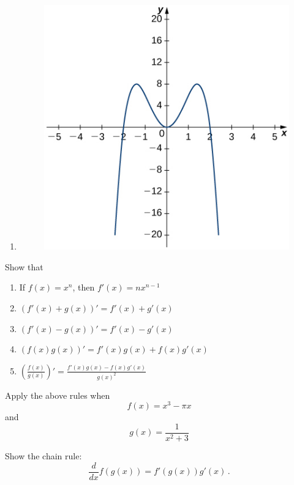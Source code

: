 \documentclass[12pt]{amsart}
\begin{document}
\begin{question}
\begin{enumerate}
		\item
		      \begin{figure}[!ht]
			      \includegraphics{figures/3.jpeg}
		      \end{figure}
	\end{enumerate}
\end{question}


\begin{question}
	Show that
	\begin{enumerate}
		\item If $\displaystyle f(x) = x^n$, then $f'(x) = n x^{n-1}$
		      \vspace{5cm}
		\item $ (f'(x) + g(x))' = f'(x) + g'(x)$
		      \vspace{5cm}
		\item $ (f'(x) - g(x))' = f'(x) - g'(x)$
		      \vspace{5cm}
		\item  $\displaystyle (f(x)g(x))'  = f'(x) g(x) + f(x) g'(x)$
		      \vspace{5cm}
		\item  $\displaystyle \left(\frac{f(x)}{g(x)}\right)'  = \frac{ f'(x) g(x) - f(x) g'(x)}{g(x)^2}$
		      \vspace{5cm}
	\end{enumerate}
\end{question}

\begin{question}
	Apply the above rules when
	$$f(x) = x^3 -\pi x$$
	and
	$$ g(x) = \frac{1}{x^2 + 3} $$
\end{question}
\newpage


\begin{question}
	Show the chain rule:
	\begin{equation*}
		\frac{d}{dx} f(g(x)) = f'(g(x)) g'(x) \,.
	\end{equation*}
\end{question}

\printbibliography
\end{document}
